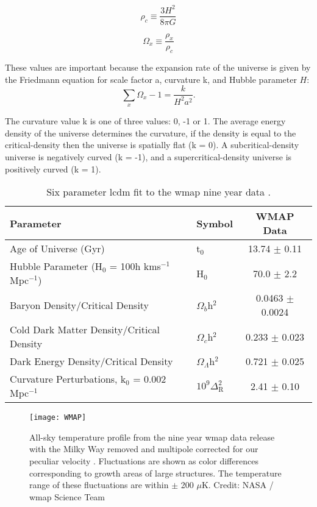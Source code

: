 \begin{equation}
\label{Eq:criticalEnergyDensity}
\rho_c \equiv \frac{3H^2}{8 \pi G}
\end{equation}

\begin{equation}
\label{Eq:energyDensity}
\Omega_x  \equiv \frac{\rho_x}{\rho_c}
\end{equation}

These values are important because the expansion rate of the universe is given by the Friedmann equation for scale factor a, curvature k, and Hubble parameter $H$:
\begin{equation}
\label{Eq:friedmann}
\sum\limits_{x} \Omega_x -1 = \frac{k}{H^2 a^2}.
\end{equation}

The curvature value k is one of three values: 0, -1 or 1. The average energy density of the universe determines the curvature, if the density is equal to the critical-density then the universe is spatially flat (k = 0). A subcritical-density universe is negatively curved (k = -1), and a supercritical-density universe is positively curved (k = 1). 

\begin{table}
\centering
\caption{Six parameter \gls{lcdm} fit to the \gls{wmap} nine year data \cite{wmap9Year}.}
\begin{tabular}{l	l	c}
\hline
\hline
Parameter												&	Symbol											&	WMAP Data\\
\hline
Age of Universe (Gyr)									&	t$_0$											& 13.74 $\pm$ 0.11\\
Hubble Parameter (H$_{0}$ = 100h kms$^{-1}$Mpc$^{-1}$)	&	H$_0$											& 70.0 $\pm$ 2.2\\
Baryon Density/Critical Density							&	$\Omega_b$h$^2$									& 0.0463 $\pm$ 0.0024\\
Cold Dark Matter Density/Critical Density				&	$\Omega_c$h$^2$									& 0.233 $\pm$ 0.023\\
Dark Energy Density/Critical Density					&	$\Omega_{\Lambda}$h$^2$							& 0.721 $\pm$ 0.025\\
Curvature Perturbations, k$_0$ = 0.002 Mpc$^{-1}$		&	$10^9 \Delta^2_{\text{R}}$						& 2.41 $\pm$ 0.10\\
\hline
\hline
\end{tabular}
\label{Table:wmapPerams}
\end{table}


\begin{figure}[ht]
\centering
\texttt{[image: WMAP]}
\caption{All-sky temperature profile from the nine year \gls{wmap} data release with the Milky Way removed and multipole corrected for our peculiar velocity \cite{wmap9Year}. Fluctuations are shown as color differences corresponding to growth areas of large structures. The temperature range of these fluctuations are within $\pm$ 200 $\mu$K. Credit: NASA / \gls{wmap} Science Team}
\label{Fig:wmap}
\end{figure}

